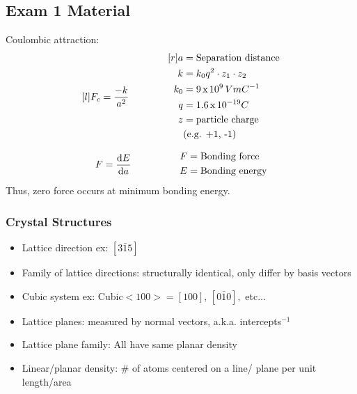 \documentclass{equation-sheet}
\begin{document}
\subsection*{Exam 1 Material}
Coulombic attraction:
\begin{equation*}
	\begin{aligned}[l]
		F_c &= \frac{-k}{a^2} \\
	\end{aligned} 
	\qquad \qquad
	\begin{aligned}[r]
	    a &= \text{Separation distance} \\
		k &= k_0 q^2 \cdot z_1 \cdot z_2 \\
		k_0 &= \scinote{9}{9} \, V m C^{-1} \\
		q &= \scinote{1.6}{-19} C \\
		z &= \text{particle charge} \\
		& \text{(e.g. +1, -1)}
	\end{aligned}
\end{equation*}

\begin{equation*}
    \begin{aligned}
        F &= \dfrac{\mathrm{d}E}{\mathrm{d}a}
    \end{aligned}
    \qquad \qquad
    \begin{aligned}
        F &= \text{Bonding force} \\
        E &= \text{Bonding energy}
    \end{aligned}
\end{equation*}
\noindent Thus, zero force occurs at minimum bonding energy.
\sepspace

\secbreak

\subsubsection*{Crystal Structures}

\begin{itemize}
    \item Lattice direction ex: $[3 \bar 1 5]$
    \item Family of lattice directions: structurally identical, only differ by basis vectors
    \item Cubic system ex: Cubic$<100>=[100],\, [0 \bar 1 0],$ etc...
    \item Lattice planes: measured by normal vectors, a.k.a. intercepts$^{-1}$
    \item Lattice plane family: All have same planar density
    \item Linear/planar density: \# of atoms centered on a line/ plane per unit length/area
\end{itemize}
\end{document}
